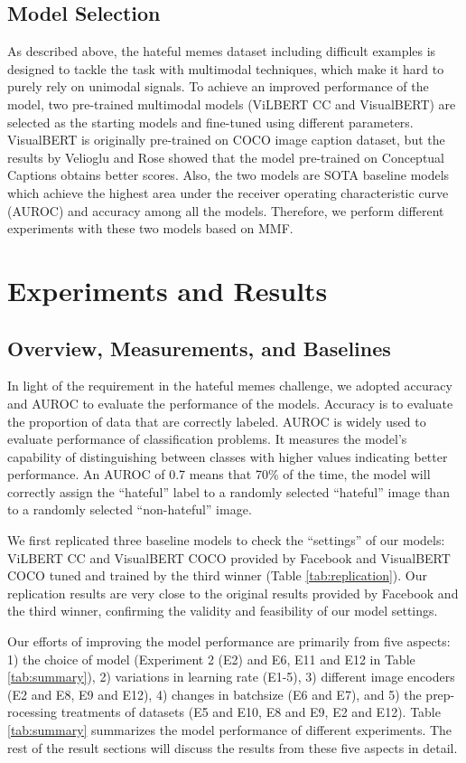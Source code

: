 \documentclass[10pt,twocolumn,letterpaper]{article}
\begin{document}
\subsection{Model Selection}
As described above, the hateful memes dataset including difficult examples is designed to tackle the task with multimodal techniques, which make it hard to purely rely on unimodal signals. To achieve an improved performance of the model, two pre-trained multimodal models (ViLBERT CC and VisualBERT) are selected as the starting models and fine-tuned using different parameters. VisualBERT is originally pre-trained on COCO image caption dataset, but the results by Velioglu and Rose \cite{e_velioglu2020detecting} showed that the model pre-trained on Conceptual Captions obtains better scores. Also, the two models are SOTA baseline models which achieve the highest area under the receiver operating characteristic curve (AUROC) and accuracy among all the models. Therefore, we perform different experiments with these two models based on MMF. 

\section{Experiments and Results}
\subsection{Overview, Measurements, and Baselines}
In light of the requirement in the hateful memes challenge, we adopted accuracy and AUROC to evaluate the performance of the models. Accuracy is to evaluate the proportion of data that are correctly labeled. AUROC is widely used to evaluate performance of classification problems. It measures the model’s capability of distinguishing between classes with higher values indicating better performance. An AUROC of 0.7 means that 70\% of the time, the model will correctly assign the “hateful” label to a randomly selected “hateful” image than to a randomly selected “non-hateful” image.
 
We first replicated three baseline models to check the “settings” of our models: ViLBERT CC and VisualBERT COCO provided by Facebook \cite{d_kiela2021hateful} and VisualBERT COCO tuned and trained by the third winner \cite{e_velioglu2020detecting} (Table \ref{tab:replication}). Our replication results are very close to the original results provided by Facebook and the third winner, confirming the validity and feasibility of our model settings.

Our efforts of improving the model performance are primarily from five aspects: 1) the choice of model (Experiment 2 (E2) and E6, E11 and E12  in Table \ref{tab:summary}), 2) variations in learning rate (E1-5), 3) different image encoders (E2 and E8, E9 and E12), 4) changes in batchsize (E6 and E7), and 5) the prep-rocessing treatments of datasets (E5 and E10, E8 and E9, E2 and E12). Table \ref{tab:summary} summarizes the model performance of different experiments. The rest of the result sections will discuss the results from these five aspects in detail.
\end{document}
